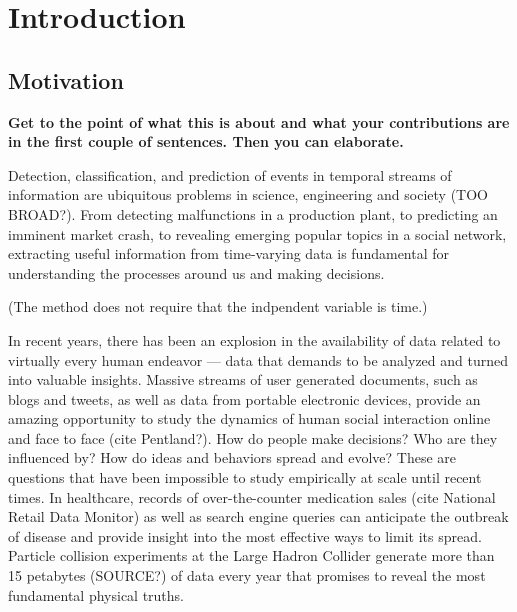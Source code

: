 \chapter{Introduction}
\label{ch:intro}
\section{Motivation}

{\bf Get to the point of what this is about and what your contributions are in
  the first couple of sentences. Then you can elaborate.}

Detection, classification, and prediction of events in temporal streams of
information are ubiquitous problems in science, engineering and society (TOO
BROAD?). From detecting malfunctions in a production plant, to predicting an
imminent market crash, to revealing emerging popular topics in a social network,
extracting useful information from time-varying data is fundamental for
understanding the processes around us and making decisions.

(The method does not require that the indpendent variable is time.)

In recent years, there has been an explosion in the availability of data related
to virtually every human endeavor --- data that demands to be analyzed and
turned into valuable insights. Massive streams of user generated documents, such
as blogs and tweets, as well as data from portable electronic devices, provide
an amazing opportunity to study the dynamics of human social interaction online
and face to face (cite Pentland?). How do people make decisions? Who are they
influenced by? How do ideas and behaviors spread and evolve? These are questions
that have been impossible to study empirically at scale until recent times. In
healthcare, records of over-the-counter medication sales (cite National Retail
Data Monitor) as well as search engine queries can anticipate the outbreak of
disease and provide insight into the most effective ways to limit its
spread. Particle collision experiments at the Large Hadron Collider generate
more than 15 petabytes (SOURCE?) of data every year that promises to reveal the
most fundamental physical truths.

